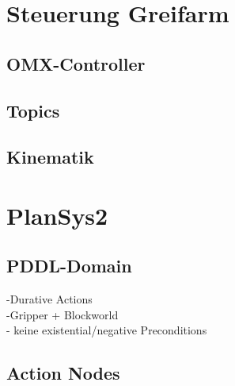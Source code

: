 \section{Steuerung Greifarm}
\subsection{OMX-Controller}
\subsection{Topics}
\subsection{Kinematik}


\section{PlanSys2}
\subsection{PDDL-Domain}
-Durative Actions\\
-Gripper + Blockworld\\
- keine existential/negative Preconditions\\
\subsection{Action Nodes}

